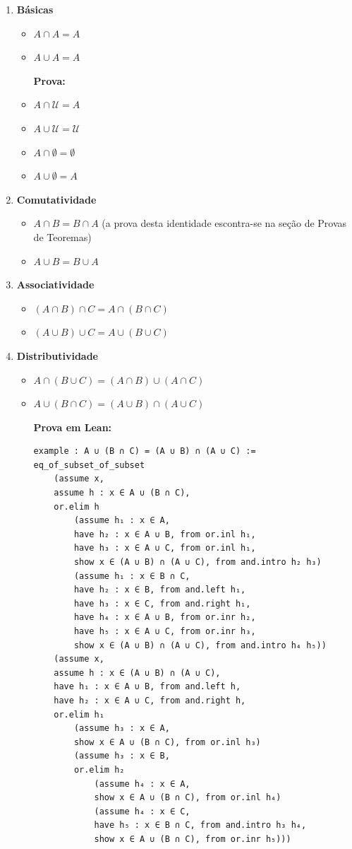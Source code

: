\begin{enumerate}
\item{\textbf{Básicas}}
\begin{itemize}
\item $A \cap A = A$

\qquad

\item $A \cup A = A$

\textbf{Prova:}

\qquad

\item $A \cap \mathcal U = A$
\item $A \cup \mathcal U = \mathcal U$
\item $A \cap \emptyset = \emptyset$
\item $A \cup \emptyset = A$
\end{itemize}

\item{\textbf{Comutatividade}}
\begin{itemize}
\item $A \cap B = B \cap A$ (a prova desta identidade escontra-se na seção de Provas de Teoremas)
\item $A \cup B = B \cup A$
\end{itemize}

\item{\textbf{Associatividade}}
\begin{itemize}
\item $(A \cap B) \cap C = A \cap (B \cap C)$
\item $(A \cup B) \cup C = A \cup (B \cup C)$
\end{itemize}

\item{\textbf{Distributividade}}
\begin{itemize}
\item $A \cap (B \cup C) = (A \cap B) \cup (A \cap C)$
\item $A \cup (B \cap C) = (A \cup B) \cap (A \cup C)$

\textbf{Prova em Lean:}
\begin{lstlisting}
example : A ∪ (B ∩ C) = (A ∪ B) ∩ (A ∪ C) :=
eq_of_subset_of_subset
    (assume x,
    assume h : x ∈ A ∪ (B ∩ C),
    or.elim h
        (assume h₁ : x ∈ A,
        have h₂ : x ∈ A ∪ B, from or.inl h₁,
        have h₃ : x ∈ A ∪ C, from or.inl h₁,
        show x ∈ (A ∪ B) ∩ (A ∪ C), from and.intro h₂ h₃)
        (assume h₁ : x ∈ B ∩ C,
        have h₂ : x ∈ B, from and.left h₁,
        have h₃ : x ∈ C, from and.right h₁,
        have h₄ : x ∈ A ∪ B, from or.inr h₂,
        have h₅ : x ∈ A ∪ C, from or.inr h₃,
        show x ∈ (A ∪ B) ∩ (A ∪ C), from and.intro h₄ h₅))
    (assume x,
    assume h : x ∈ (A ∪ B) ∩ (A ∪ C),
    have h₁ : x ∈ A ∪ B, from and.left h,
    have h₂ : x ∈ A ∪ C, from and.right h,
    or.elim h₁
        (assume h₃ : x ∈ A,
        show x ∈ A ∪ (B ∩ C), from or.inl h₃)
        (assume h₃ : x ∈ B,
        or.elim h₂
            (assume h₄ : x ∈ A,
            show x ∈ A ∪ (B ∩ C), from or.inl h₄)
            (assume h₄ : x ∈ C,
            have h₅ : x ∈ B ∩ C, from and.intro h₃ h₄,
            show x ∈ A ∪ (B ∩ C), from or.inr h₅))) \end{lstlisting}


\end{itemize}
\end{enumerate}
